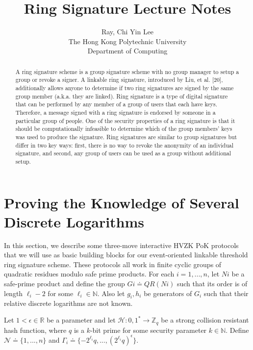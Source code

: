 \documentclass[11pt]{article}
\begin{document}
\title{Ring Signature Lecture Notes}
\author{Ray, Chi Yin Lee\\
The Hong Kong Polytechnic University\\
Department of Computing}
\renewcommand{\today}{June 20, 2019}

\maketitle
\begin{abstract}
   A ring signature scheme is a group signature scheme with
no group manager to setup a group or revoke a signer. A linkable ring
signature, introduced by Liu, et al. [20], additionally allows anyone to
determine if two ring signatures are signed by the same group member
(a.k.a. they are linked). Ring signature is a type of digital signature that can be performed by any member of a group of users that each have keys. Therefore, a message signed with a ring signature is endorsed by someone in a particular group of people. One of the security properties of a ring signature is that it should be computationally infeasible to determine which of the group members' keys was used to produce the signature. Ring signatures are similar to group signatures but differ in two key ways: first, there is no way to revoke the anonymity of an individual signature, and second, any group of users can be used as a group without additional setup.
\end{abstract}

\section{Proving the Knowledge of Several Discrete Logarithms}
In this section, we describe some three-move interactive HVZK PoK protocols
that we will use as basic building blocks for our event-oriented linkable threshold ring signature scheme. 
These protocols all work in finite cyclic groups of quadratic residues modulo safe prime products. 
For each $i = 1, . . . , n$, let $Ni$ be a safe-prime product and define the group $Gi \doteq QR(Ni)$ such that its order is of length $\ell_i - 2$ for some $\ell_i \in \mathbb{N}$. Also let $g_i, h_i$ be generators of $G_i$ such that their relative discrete logarithms are not known.

Let $1 < \epsilon  \in \mathbb{R}$ be a parameter and let $\mathcal{H} : {0,1}^* \rightarrow \mathbb{Z}_q$ be a strong collision resistant hash function, where $q$ is a $k$-bit prime for some security parameter $k \in \mathbb{N}$. Define $\mathcal{N} \doteq \{1,...,n\}$ and $\Gamma_i \doteq \{-2^{\ell_i}q,...,(2^{\ell_i}q)^\epsilon\}$.
\end{document}
